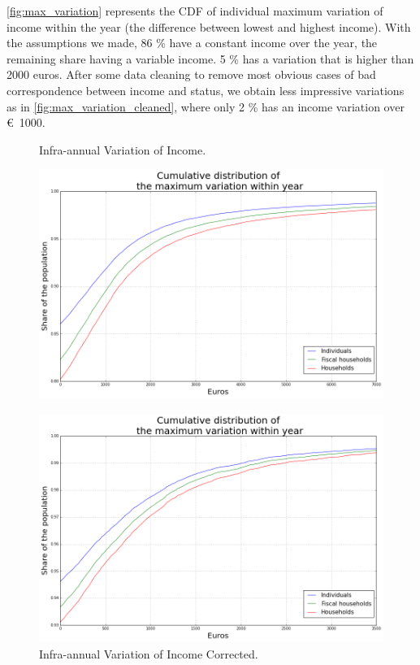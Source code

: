\autoref{fig:max_variation} represents the CDF of individual maximum variation
of income within the year (the difference between lowest and highest income).
With the assumptions we made, 86 \% have a constant income over the year, the
remaining share having a variable income. 5 \% has a variation that is higher
than 2000 euros. After some data cleaning to remove most obvious cases of bad
correspondence between income and status, we obtain less impressive variations
as in \autoref{fig:max_variation_cleaned}, where only 2 \% has an income
variation over \euro\ 1000.
        

\begin{figure}[ptb]
\caption{Infra-annual Variation of Income.}%



\begin{center}
\includegraphics[width=\textwidth]{share_of_max_variation.png}
\label{fig:max_variation}
\caption{Infra-annual Variation of Income Corrected.}%
\label{fig:max_variation_cleaned}
\includegraphics[width=\textwidth]{share_of_max_variation_cleaned.png}
\end{center}
\end{figure}



